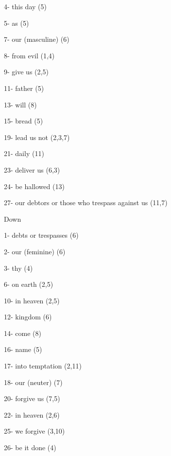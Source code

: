 \item{4}{- this day (5)} 
\item{5}{- as (5)} 
\item{7}{- our (masculine) (6)} 
\item{8}{- from evil (1,4)} 
\item{9}{- give us (2,5)} 
\item{11}{- father (5)} 
\item{13}{- will (8)} 
\item{15}{- bread (5)} 
\item{19}{- lead us not (2,3,7)} 
\item{21}{- daily (11)} 
\item{23}{- deliver us (6,3)} 
\item{24}{- be hallowed (13)} 
\item{27}{- our debtors or those who trespass against us (11,7)} 

\noindent Down 

\item{1}{- debts or trespasses (6)} 
\item{2}{- our (feminine) (6)} 
\item{3}{- thy (4)} 
\item{6}{- on earth (2,5)} 
\item{10}{- in heaven (2,5)} 
\item{12}{- kingdom (6)} 
\item{14}{- come (8)} 
\item{16}{- name (5)} 
\item{17}{- into temptation (2,11)} 
\item{18}{- our (neuter) (7) } 
\item{20}{- forgive us (7,5)} 
\item{22}{- in heaven (2,6)} 
\item{25}{- we forgive (3,10)} 
\item{26}{- be it done (4)} 
\bye
